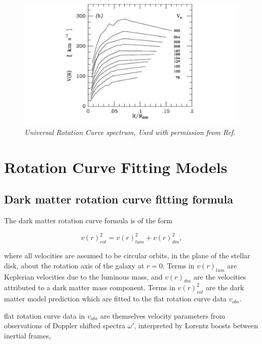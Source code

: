 \documentclass[reprint,%
 amsmath,amssymb,
 aps,
]{revtex4-1}
\begin{document}
  
 \begin{figure}[h!]
     \centering
     \includegraphics[width=\linewidth]{URC}
     \caption{\emph{Universal Rotation Curve spectrum, Used with permission from Ref.\citep{salucci}}}
     \label{fig:URC}
\end{figure}
  

  
    

\section{ Rotation Curve Fitting Models  \label{sec:dos}}
 
 
 \subsection{Dark matter rotation curve fitting formula}
 
  

 The   dark matter rotation curve formula   is of the form

 \begin{equation}
v(r)^2_{rot}  =  v(r)^2_{lum}  +  v(r)^2_{dm},   
\label{eq:zonte1}
\end{equation} 

  where all velocities are assumed to be circular orbits, in the plane of the stellar disk,  about the rotation axis of the galaxy at  $r=0$. Terms in $v(r)_{lum}$ are Keplerian velocities due to the luminous mass, and $v(r)_{dm}$ are the velocities attributed to a  dark matter mass component. 
  Terms in $v(r)^2_{rot} $ are the dark matter model prediction which are fitted to the flat rotation curve data
  $v_{obs}$.
  
  flat rotation curve data in  $v_{obs}$ are themselves velocity parameters   from  observations of    Doppler shifted spectra $\omega'$,  interpreted by 
 Lorentz boosts between inertial frames, 
   
\end{document}
